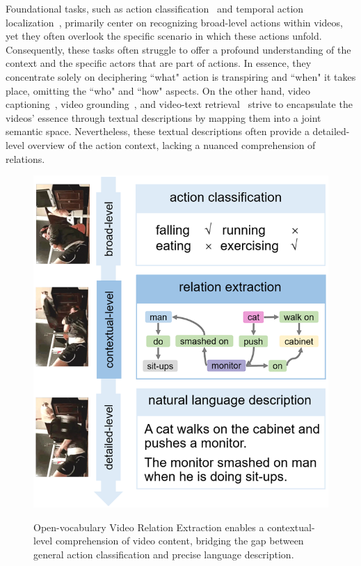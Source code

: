 \documentclass[letterpaper]{article}
\begin{document}
Foundational tasks, such as action classification~\cite{kong2022human} and temporal action localization~\cite{9062498}, primarily center on recognizing broad-level actions within videos, yet they often overlook the specific scenario in which these actions unfold. Consequently, these tasks often struggle to offer a profound understanding of the context and the specific actors that are part of actions. In essence, they concentrate solely on deciphering ``what" action is transpiring and ``when" it takes place, omitting the ``who" and ``how" aspects.
On the other hand, video captioning~\cite{chen2019deep}, video grounding~\cite{chen2019semantic, wang2021visual}, and video-text retrieval~\cite{song2023relation} strive to encapsulate the videos' essence through textual descriptions by mapping them into a joint semantic space. Nevertheless, these textual descriptions often provide a detailed-level overview of the action context, lacking a nuanced comprehension of relations.






\begin{figure}[t]
\centering
\resizebox{0.7\linewidth}{!}
{\includegraphics{fig/broad2detail1.png}}
\caption{Open-vocabulary  Video Relation Extraction enables a contextual-level comprehension of video content, bridging the gap between general action classification and precise language description.}
\label{fig:motivation}
\end{figure}
\end{document}
